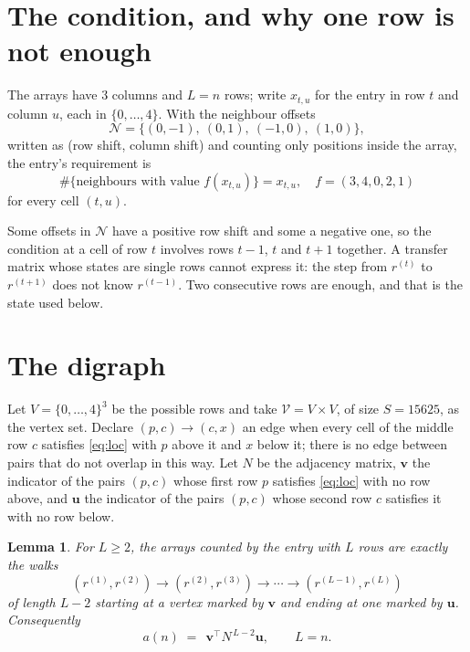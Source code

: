 \documentclass[11pt,a4paper]{article}
\theoremstyle{plain}
\newtheorem{lemma}[theorem]{Lemma}
\theoremstyle{definition}
\begin{document}
\section{The condition, and why one row is not enough}

The arrays have $3$ columns and $L=n$ rows; write $x_{t,u}$ for the entry in
row $t$ and column $u$, each in $\{0,\dots,4\}$. With the neighbour offsets
\[
\mathcal N=\{(0,-1),\ (0,1),\ (-1,0),\ (1,0)\},
\]
written as (row shift, column shift) and counting only positions inside the array, the
entry's requirement is
\begin{equation}\label{eq:loc}
\#\{\text{neighbours with value }f(x_{t,u})\}=x_{t,u},\quad f=(3,4,0,2,1)
\end{equation}
for every cell $(t,u)$.

Some offsets in $\mathcal N$ have a positive row shift and some a negative one, so the
condition at a cell of row $t$ involves rows $t-1$, $t$ and $t+1$ together. A transfer
matrix whose states are single rows cannot express it: the step from $r^{(t)}$ to
$r^{(t+1)}$ does not know $r^{(t-1)}$. Two consecutive rows are enough, and that is
the state used below.

\section{The digraph}

Let $V=\{0,\dots,4\}^{3}$ be the possible rows and take
$\mathcal V=V\times V$, of size $S=15625$, as the vertex set. Declare $(p,c)\to(c,x)$ an edge
when every cell of the middle row $c$ satisfies \eqref{eq:loc} with $p$ above it and $x$
below it; there is no edge between pairs that do not overlap in this way. Let $N$ be the
adjacency matrix, $\mathbf{v}$ the indicator of the pairs $(p,c)$ whose first row $p$
satisfies \eqref{eq:loc} with no row above, and $\mathbf{u}$ the indicator of
the pairs $(p,c)$ whose second row $c$ satisfies it with no row below.

\begin{lemma}\label{lem:walk}
For $L\ge2$, the arrays counted by the entry with $L$ rows are exactly the walks
\[
(r^{(1)},r^{(2)})\to(r^{(2)},r^{(3)})\to\cdots\to(r^{(L-1)},r^{(L)})
\]
of length $L-2$ starting at a vertex marked by $\mathbf{v}$ and ending at one marked by
$\mathbf{u}$. Consequently
\[
a(n)\;=\;\,\mathbf{v}^{\!\top}N^{\,L-2}\mathbf{u},\qquad L=n .
\]
\end{lemma}
\end{document}
